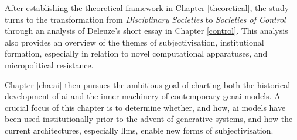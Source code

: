 
After establishing the theoretical framework in Chapter \ref{theoretical}, the study turns to the transformation from \textit{Disciplinary Societies} to \textit{Societies of Control} through an analysis of Deleuze’s short essay  in Chapter \ref{control}. This analysis also provides an overview of the themes of subjectivisation, institutional formation, especially in relation to novel computational apparatuses, and micropolitical resistance.

Chapter \ref{cha:ai} then pursues the ambitious goal of charting both the historical development of \gls{ai} and the inner machinery of contemporary \gls{genai} models. A crucial focus of this chapter is to determine whether, and how, \gls{ai} models have been used institutionally prior to the advent of generative systems, and how the current architectures, especially \glspl{llm}, enable new forms of subjectivisation.

